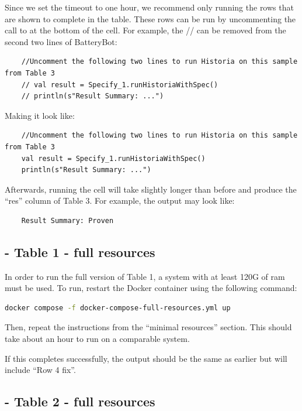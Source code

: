 \documentclass{acmart} %
\begin{document}
Since we set the timeout to one hour, we recommend only running the rows that are shown to complete in the table.  These rows can be run by uncommenting the call to  at the bottom of the cell.  For example, the // can be removed from the second two lines of BatteryBot:

\begin{lstlisting}
    //Uncomment the following two lines to run Historia on this sample from Table 3
    // val result = Specify_1.runHistoriaWithSpec()
    // println(s"Result Summary: ...")
\end{lstlisting}

Making it look like: 

\begin{lstlisting}
    //Uncomment the following two lines to run Historia on this sample from Table 3
    val result = Specify_1.runHistoriaWithSpec()
    println(s"Result Summary: ...")
\end{lstlisting}


Afterwards, running the cell will take slightly longer than before  and produce the ``res'' column of Table 3.  For example, the output may look like:

\begin{lstlisting} 
    Result Summary: Proven
\end{lstlisting}




\subsection{ - Table 1 - full resources}

In order to run the full version of Table 1, a system with at least 120G of ram must be used. To run, restart the Docker container using the following command:

\begin{lstlisting}[language=bash]
  docker compose -f docker-compose-full-resources.yml up
\end{lstlisting}

Then, repeat the instructions from the ``minimal resources'' section.  This should take about an hour to run on a comparable system.

If this completes successfully, the output should be the same as earlier but will include ``Row 4 fix''.  

\subsection{ - Table 2 - full resources}
\end{document}
